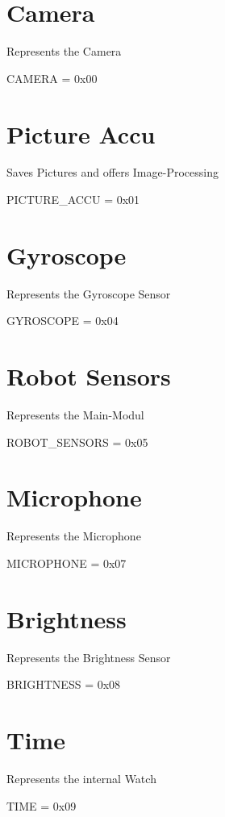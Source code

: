 \label{modul_doc_modulDocAnchor}%
\hypertarget{modul_doc_modulDocAnchor}{}%
 \hypertarget{modul_doc_Camera}{}\section{Camera}\label{modul_doc_Camera}
Represents the Camera\par
 C\-A\-M\-E\-R\-A = 0x00\hypertarget{modul_doc_PictureAccu}{}\section{Picture Accu}\label{modul_doc_PictureAccu}
Saves Pictures and offers Image-\/\-Processing\par
 P\-I\-C\-T\-U\-R\-E\-\_\-\-A\-C\-C\-U = 0x01\hypertarget{modul_doc_Gyroscope}{}\section{Gyroscope}\label{modul_doc_Gyroscope}
Represents the Gyroscope Sensor\par
 G\-Y\-R\-O\-S\-C\-O\-P\-E = 0x04\hypertarget{modul_doc_RobotSensors}{}\section{Robot Sensors}\label{modul_doc_RobotSensors}
Represents the Main-\/\-Modul\par
 R\-O\-B\-O\-T\-\_\-\-S\-E\-N\-S\-O\-R\-S = 0x05\hypertarget{modul_doc_Microphone}{}\section{Microphone}\label{modul_doc_Microphone}
Represents the Microphone\par
 M\-I\-C\-R\-O\-P\-H\-O\-N\-E = 0x07\hypertarget{modul_doc_Brightness}{}\section{Brightness}\label{modul_doc_Brightness}
Represents the Brightness Sensor\par
 B\-R\-I\-G\-H\-T\-N\-E\-S\-S = 0x08\hypertarget{modul_doc_Time}{}\section{Time}\label{modul_doc_Time}
Represents the internal Watch\par
 T\-I\-M\-E = 0x09 